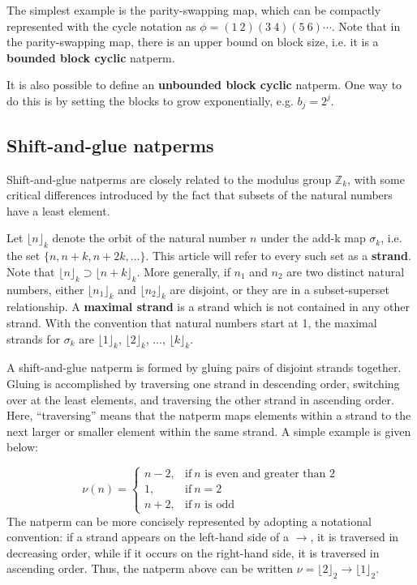 \documentclass[12pt,reqno]{article}
\begin{document}
The simplest example is the parity-swapping map, which can be compactly represented with the cycle notation as $\phi = (1 \ 2)(3 \ 4)(5 \ 6)\cdots$. Note that in the parity-swapping map, there is an upper bound on block size, i.e. it is a \textbf{bounded block cyclic} natperm.

It is also possible to define an \textbf{unbounded block cyclic} natperm. One way to do this is by setting the blocks to grow exponentially, e.g. $b_j = 2^j$.

\subsection{Shift-and-glue natperms}

Shift-and-glue natperms are closely related to the modulus group $\mathbb{Z}_k$, with some critical differences introduced by the fact that subsets of the natural numbers have a least element.

Let ${\lfloor n \rfloor}_k$ denote the orbit of the natural number $n$ under the add-k map $\sigma_k$, i.e. the set $\{ n, n + k, n + 2k, \ldots \}$. This article will refer to every such set as a \textbf{strand}. Note that ${\lfloor n \rfloor}_k \supset {\lfloor n + k \rfloor}_k$. More generally, if $n_1$ and $n_2$ are two distinct natural numbers, either ${\lfloor n_1 \rfloor}_k$ and ${\lfloor n_2 \rfloor}_k$ are disjoint, or they are in a subset-superset relationship. A \textbf{maximal strand} is a strand which is not contained in any other strand. With the convention that natural numbers start at 1, the maximal strands for $\sigma_k$ are ${\lfloor 1 \rfloor}_k$, ${\lfloor 2 \rfloor}_k$, $\ldots$, ${\lfloor k \rfloor}_k$. 

A shift-and-glue natperm is formed by gluing pairs of disjoint strands together. Gluing is accomplished by traversing one strand in descending order, switching over at the least elements, and traversing the other strand in ascending order. Here, ``traversing'' means that the natperm maps elements within a strand to the next larger or smaller element within the same strand. A simple example is given below:

\begin{equation}
    \nu(n) = \begin{cases}
        n - 2, & \text{if}\ n \text{ is even and greater than 2} \\
        1, & \text{if}\ n = 2 \\
        n + 2, & \text{if}\ n \text{ is odd} 
    \end{cases}
\end{equation}
The natperm can be more concisely represented by adopting a notational convention: if a strand appears on the left-hand side of a $\rightarrow$, it is traversed in decreasing order, while if it occurs on the right-hand side, it is traversed in ascending order. Thus, the natperm above can be written $\nu = {\lfloor 2 \rfloor}_2 \rightarrow {\lfloor 1 \rfloor}_2$.
\end{document}
